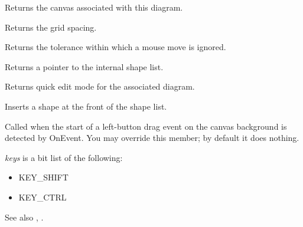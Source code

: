 Returns the canvas associated with this diagram.



Returns the grid spacing.



Returns the tolerance within which a mouse move is ignored.



Returns a pointer to the internal shape list.



Returns quick edit mode for the associated diagram.



Inserts a shape at the front of the shape list.

\label{wxshapecanvasonbegindragleft}


Called when the start of a left-button drag event on the canvas background is detected by OnEvent. You may override this member;
by default it does nothing.

{\it keys} is a bit list of the following:

\begin{itemize}\itemsep=0pt
\item KEY\_SHIFT
\item KEY\_CTRL
\end{itemize}

See also , .

\label{wxshapecanvasonbegindragright}


